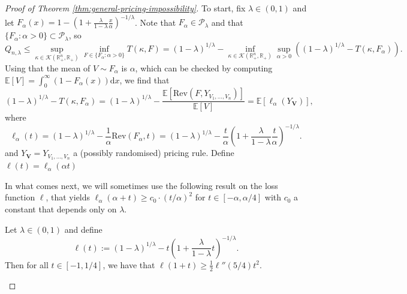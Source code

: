 \documentclass[11pt]{article}
\newcommand{\dn}[1]{\textcolor{red}{\small({\sf Daan: }{\sl #1})}}
\newcommand{\pk}[1]{\textcolor{ForestGreen}{\small({\sf Pieter: }{\sl #1})}}
\newcommand{\E}{\mathbb{E}}
\newcommand{\Rplus}{\mathbb{R}_+}
\newcommand{\Rev}{\mathrm{Rev}}
\begin{document}
\begin{proof}[Proof of Theorem \ref{thm:general-pricing-impossibility}]
    
To start, fix $\lambda\in(0,1)$ and let $F_\alpha(x)=1-\left(1+\frac{\lambda}{1-\lambda}\frac{x}{\alpha}\right)^{-1/\lambda}$. Note that $F_\alpha\in \mathcal{P}_\lambda$ and that $\{F_\alpha:\alpha>0\}\subset \mathcal{P}_\lambda$, so
$$
Q_{n,\lambda}\le\sup_{\kappa\in \mathcal{K}(\Rplus^n,\Rplus)}\inf_{F\in\{F_\alpha:\alpha>0\}}T(\kappa,F)=(1-\lambda)^{1/\lambda}-\inf_{\kappa\in \mathcal{K}(\Rplus^n,\Rplus)}\sup_{\alpha>0}\left((1-\lambda)^{1/\lambda}-T(\kappa,F_\alpha)\right).
$$
Using that the mean of $V \sim F_{\alpha}$ is $\alpha$, which can be checked by computing $\E[V] = \int_0^\infty (1-F_\alpha(x))\mathrm{d}x$, we find that
$$
(1-\lambda)^{1/\lambda}-T(\kappa,F_\alpha) = (1-\lambda)^{1/\lambda} - \frac{\E[\Rev(F,Y_{V_1,\dots,V_n})]}{\E[V]} =\E[\ell_\alpha(Y_{\boldsymbol{V}})],
$$
where 
$$\ell_\alpha(t)=(1-\lambda)^{1/\lambda}-\frac{1}{\alpha}\Rev(F_\alpha,t)=(1-\lambda)^{1/\lambda}-\frac{t}{\alpha}\left(1+\frac{\lambda}{1-\lambda}\frac{t}{\alpha}\right)^{-1/\lambda}.$$
and $Y_{\boldsymbol{V}} = Y_{V_1,\dots,V_n}$ a (possibly randomised) pricing rule. Define $\ell(t)=\ell_\alpha(\alpha t)$

In what comes next, we will sometimes use the following result on the loss function $\ell$, that yields $\ell_\alpha(\alpha+t)\ge c_0\cdot(t/\alpha)^2$ for $t\in[-\alpha,\alpha/4]$ with $c_0$ a constant that depends only on $\lambda$. 
\begin{lemma}
    \label{lemma:ell-quad-bound}
    Let $\lambda\in(0,1)$ and define
    $$\ell(t):=(1-\lambda)^{1/\lambda}-t\left(1+\frac{\lambda}{1-\lambda}t\right)^{-1/\lambda}.$$
    Then for all $t\in[-1,1/4]$, we have that $\ell(1+t)\ge \frac{1}{2}\ell''(5/4)t^2$.
\end{lemma}








\end{proof}
\end{document}

